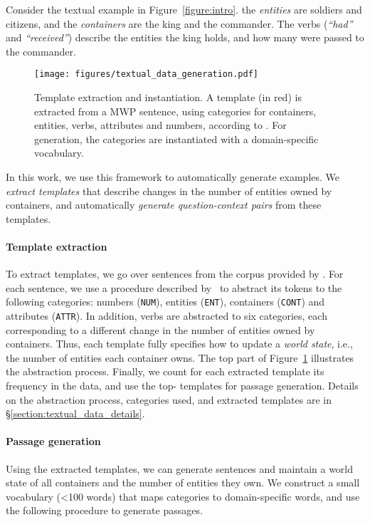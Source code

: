 \documentclass[11pt,a4paper]{article}
\newcommand\nl[1]{{\it``#1''}}
\begin{document}
Consider the textual example in Figure~\ref{figure:intro}. the \emph{entities} are soldiers and citizens, and the \emph{containers} are the king and the commander. The verbs (\nl{had} and \nl{received}) describe the entities the king holds, and how many were passed to the commander.



\begin{figure}
\setlength{\belowcaptionskip}{-15pt}
    \centering
    \texttt{[image: figures/textual\_data\_generation.pdf]}
    \caption{Template extraction and instantiation.
    A template (in red) is extracted from a MWP sentence, using categories for containers, entities, verbs, attributes and numbers, according to \citet{hosseini2014learning}. For generation, the categories are instantiated with a domain-specific vocabulary.}
    \label{figure:textual_data_generation}
\end{figure}

In this work, we use this framework to automatically generate examples. We \emph{extract templates} that describe changes in the number of entities owned by containers, and automatically \emph{generate question-context pairs} from these templates.

\paragraph{Template extraction}
To extract templates, we go over sentences from the corpus provided by \citet{hosseini2014learning}. For each sentence, we use a procedure described by~\citet{hosseini2014learning}
to abstract its tokens to the following categories:
numbers (\texttt{NUM}), entities (\texttt{ENT}), containers (\texttt{CONT}) and attributes (\texttt{ATTR}). 
In addition, verbs are abstracted to six categories, each corresponding to a different change in the number of entities owned by containers.
Thus, each template fully specifies how to update a \emph{world state}, i.e., the number of entities each container owns. 
The top part of Figure~\ref{figure:textual_data_generation} illustrates the abstraction process.
Finally, we count for each extracted template its frequency in the data, and use the top- templates for passage generation.
Details on the abstraction process, categories used, and extracted templates are in \S\ref{section:textual_data_details}.






\paragraph{Passage generation}
Using the extracted templates, we can generate sentences and maintain a world state of all containers and the number of entities they own. 
We construct a small vocabulary (<100 words) that maps categories to domain-specific words, and use the following procedure to generate passages.
\end{document}
